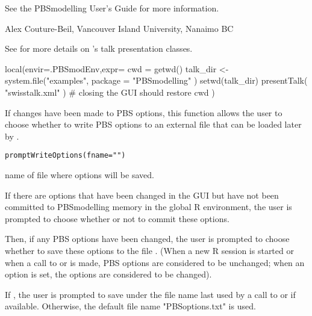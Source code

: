 \documentclass[letterpaper]{book}
\begin{document}
%
\begin{Note}\relax
See the PBSmodelling User's Guide for more information.
\end{Note}
%
\begin{Author}\relax
 
Alex Couture-Beil, Vancouver Island University, Nanaimo BC
\end{Author}
%
\begin{SeeAlso}\relax
See  for more details on 
's talk presentation classes.
\end{SeeAlso}
%
\begin{Examples}
\begin{ExampleCode}
local(envir=.PBSmodEnv,expr={
  cwd = getwd()
  talk_dir <- system.file("examples", package = "PBSmodelling" )
  setwd(talk_dir)
  presentTalk( "swisstalk.xml" ) # closing the GUI should restore cwd
})
\end{ExampleCode}
\end{Examples}
%
\begin{Description}\relax
If changes have been made to PBS options, this function allows 
the user to choose whether to write PBS options to an external 
file that can be loaded later by .
\end{Description}
%
\begin{Usage}
\begin{verbatim}
promptWriteOptions(fname="")
\end{verbatim}
\end{Usage}
%
\begin{Arguments}
\begin{ldescription}
\item[\code{fname}] name of file where options will be saved.
\end{ldescription}
\end{Arguments}
%
\begin{Details}\relax
If there are options that have been changed in the GUI but have not been
committed to PBSmodelling memory in the global R environment, the user
is prompted to choose whether or not to commit these options.

Then, if any PBS options have been changed, the user is prompted to choose
whether to save these options to the file . (When a new R session is
started or when a call to  or  is made,
PBS options are considered to be unchanged; when an option is set,
the options are considered to be changed).

If , the user is prompted to save under the file name last used 
by a call to  or  if available. 
Otherwise, the default file name "PBSoptions.txt" is used.
\end{Details}
\end{document}
